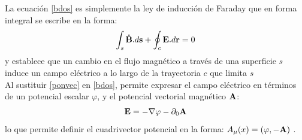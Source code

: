\documentclass[a4paper,12pt]{article}
\begin{document}
La ecuación \eqref{bdos} es simplemente la ley de inducción de Faraday que en forma integral se escribe en la forma:
\begin{equation}
\int_s {\bf\dot B}.d{\bf s}+\oint_c{\bf E}.d{\bf r}=0
\end{equation}
y establece que un cambio en el flujo magnético a través de una superficie $s$ induce un campo eléctrico a lo largo de la trayectoria $c$ que limita $s$
\\

Al sustituir \eqref{ponvec} en \eqref{bdos}, permite expresar el campo eléctrico en términos de un potencial escalar $\varphi$, y el potencial vectorial magnético ${\bf A}$:
\begin{equation}
{\bf E}=-\nabla \varphi -\partial_0{\bf  A}
\end{equation}
lo que permite definir el cuadrivector potencial en la forma: \mbox{$A_\mu(x)=(\varphi,-{\bf A})$} \cite{elec}.
\\
\end{document}
